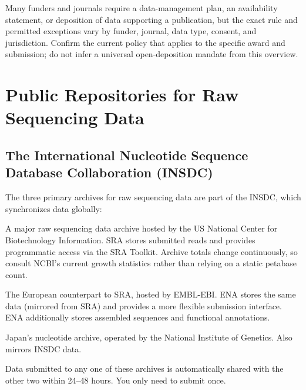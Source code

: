 Many funders and journals require a data-management plan, an availability statement, or deposition of data supporting a publication, but the exact rule and permitted exceptions vary by funder, journal, data type, consent, and jurisdiction. Confirm the current policy that applies to the specific award and submission; do not infer a universal open-deposition mandate from this overview.

\section{Public Repositories for Raw Sequencing Data}
\label{sec:datastandards:raw}

\subsection{The International Nucleotide Sequence Database Collaboration (INSDC)}

The three primary archives for raw sequencing data are part of the INSDC, which synchronizes data globally:

\begin{description}[style=nextline, font=\bfseries, itemsep=4pt]
  \item[NCBI SRA (Sequence Read Archive)]
  A major raw sequencing data archive hosted by the US National Center for Biotechnology Information. SRA stores submitted reads and provides programmatic access via the SRA Toolkit. Archive totals change continuously, so consult NCBI's current growth statistics rather than relying on a static petabase count.

  \item[ENA (European Nucleotide Archive)]
  The European counterpart to SRA, hosted by EMBL-EBI. ENA stores the same data (mirrored from SRA) and provides a more flexible submission interface. ENA additionally stores assembled sequences and functional annotations.

  \item[DDBJ (DNA Data Bank of Japan)]
  Japan's nucleotide archive, operated by the National Institute of Genetics. Also mirrors INSDC data.
\end{description}

Data submitted to any one of these archives is automatically shared with the other two within 24--48 hours. You only need to submit once.

